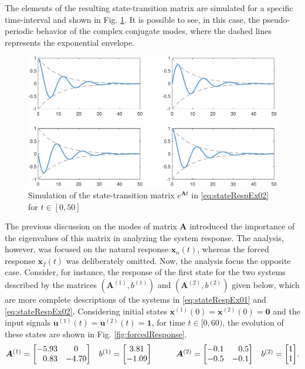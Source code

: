 \documentclass[a4paper,11pt]{book}
\numberwithin{figure}{chapter}
\numberwithin{equation}{chapter}
\numberwithin{table}{chapter}
\theoremstyle{definition}
\begin{document}
The elements of the resulting state-transition matrix are simulated for a specific time-interval and shown in Fig. \ref{fig:stateTrans02}. It is possible to see, in this case, the pseudo-periodic behavior of the complex conjugate modes, where the dashed lines represents the exponential envelope. 

\begin{figure}[ht]
    \centering
    \includegraphics[width=\textwidth]{chapter2/stateTrans02}
    \caption{Simulation of the state-transition matrix $e^{\bm{A} t}$ in \eqref{eq:stateRespEx02} for $t \in [0,50]$}
    \label{fig:stateTrans02}
\end{figure}

The previous discussion on the modes of matrix $\bm{A}$ introduced the importance of the eigenvalues of this matrix in analyzing the system response. The analysis, however, was focused on the natural response $\bm{x}_n(t)$, whereas the forced response $\bm{x}_f(t)$ was deliberately omitted. Now, the analysis focus the opposite case. Consider, for instance, the response of the first state for the two systems described by the matrices $(\bm{A}^{(1)}, b^{(1)})$ and $(\bm{A}^{(2)}, b^{(2)})$ given below, which are more complete descriptions of the systems in \eqref{eq:stateRespEx01} and \eqref{eq:stateRespEx02}. Considering initial states $\bm{x}^{(1)}(0) = \bm{x}^{(2)}(0) = \bm{0}$ and the input signals $\bm{u}^{(1)}(t) = \bm{u}^{(2)}(t) = \bm{1}$, for time $t \in [0, 60)$, the evolution of these states are shown in Fig. \ref{fig:forcedResponse}.
\begin{equation} \label{eq:isoSys02}
\begin{matrix}
    \bm{A}^{(1)} = \begin{bmatrix} 
        -5.93  &      0 \\
        \hfill 0.83   &  -4.70 
    \end{bmatrix} & b^{(1)} = \begin{bmatrix} 3.81 \\ -1.09 \end{bmatrix} & & & \bm{A}^{(2)} = \begin{bmatrix} 
         -0.1  &  \hfill 0.5 \\
        -0.5   &  -0.1 
    \end{bmatrix} & b^{(2)} = \begin{bmatrix} 1 \\ 1 \end{bmatrix}
\end{matrix}
.\end{equation}
\end{document}
